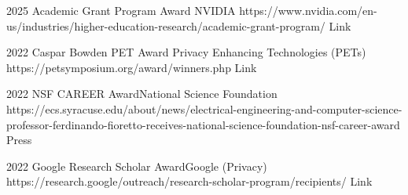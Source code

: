  

\begin{awards}
	\awardentry
	{2025}
	{Academic Grant Program Award}
	{NVIDIA}
	{https://www.nvidia.com/en-us/industries/higher-education-research/academic-grant-program/}
	{Link}

	\awardentry
	{2022}
	{Caspar Bowden PET Award}%
	{Privacy Enhancing Technologies (PETs)}
	{https://petsymposium.org/award/winners.php}
	{Link}

	\awardentry
	{2022}
	{NSF CAREER Award}{National Science Foundation}
	{https://ecs.syracuse.edu/about/news/electrical-engineering-and-computer-science-professor-ferdinando-fioretto-receives-national-science-foundation-nsf-career-award}
	{Press}

	\awardentry
	{2022}
	{Google Research Scholar Award}{Google (Privacy)}
	{https://research.google/outreach/research-scholar-program/recipients/}
	{Link}


\end{awards}
